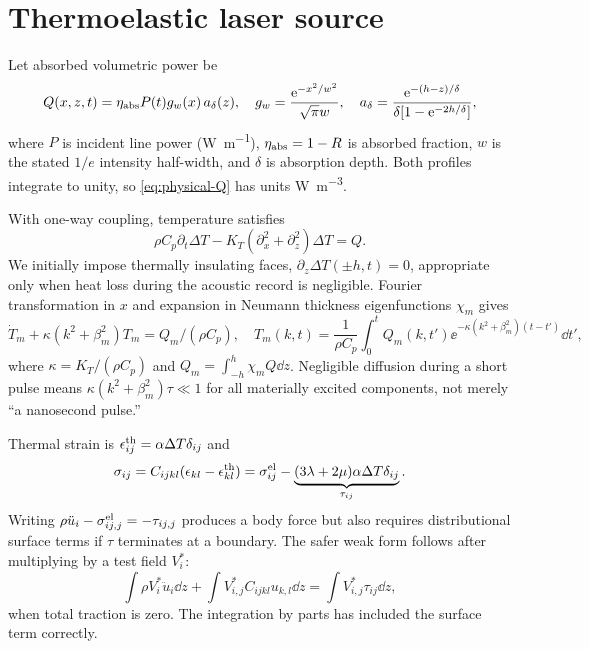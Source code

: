 \chapter{Thermoelastic laser source}\label{ch:source}
Let absorbed volumetric power be
\begin{equation}
 Q(x,z,t)=\eta_{\rm abs}P(t)g_w(x)\,a_\delta(z),\quad
 g_w=\frac{\mathrm{e}^{-x^2/w^2}}{\sqrt\pi w},\quad
 a_\delta=\frac{\mathrm{e}^{-(h-z)/\delta}}{\delta[1-\mathrm{e}^{-2h/\delta}]},
 \label{eq:physical-Q}
\end{equation}
where $P$ is incident line power (\si{W.m^{-1}}), $\eta_{\rm abs}=1-R$ is
absorbed fraction, $w$ is the stated $1/e$ intensity half-width, and $\delta$ is
absorption depth. Both profiles integrate to unity, so \cref{eq:physical-Q} has
units \si{W.m^{-3}}. 

With one-way coupling, temperature satisfies
\begin{equation}
 \rho C_p\partial_t\Delta T-K_T(\partial_x^2+\partial_z^2)\Delta T=Q.
 \label{eq:heat}
\end{equation}
We initially impose thermally insulating faces,
$\partial_z\Delta T(\pm h,t)=0$, appropriate only when heat loss during the
acoustic record is negligible.  Fourier transformation in $x$ and
expansion in Neumann thickness eigenfunctions $\chi_m$ gives
\begin{equation}
 \dot T_m+\kappa(k^2+\beta_m^2)T_m=Q_m/(\rho C_p),\quad
 T_m(k,t)=\frac1{\rho C_p}\int_0^t\!Q_m(k,t')
 \ee^{-\kappa(k^2+\beta_m^2)(t-t')}\dd t',\label{eq:heat-solution}
\end{equation}
where $\kappa=K_T/(\rho C_p)$ and
$Q_m=\int_{-h}^h\chi_mQ\dd z$. Negligible diffusion during a short pulse means
$\kappa(k^2+\beta_m^2)\tau\ll1$ for all materially excited components, not merely
``a nanosecond pulse.''

Thermal strain is $\epsilon_{ij}^{\rm th}=\alpha\Delta T\delta_{ij}$ and
\begin{equation}
 \sigma_{ij}=C_{ijkl}(\epsilon_{kl}-\epsilon_{kl}^{\rm th})
 =\sigma_{ij}^{\rm el}-\underbrace{(3\lambda+2\mu)\alpha\Delta T\delta_{ij}}_{\tau_{ij}}.
 \label{eq:thermal-stress}
\end{equation}
Writing $\rho\ddot u_i-\sigma_{ij,j}^{\rm el}=-\tau_{ij,j}$ produces a body
force but also requires distributional surface terms if $\tau$ terminates at a
boundary. The safer weak form follows after multiplying by a test field $V_i^*$:
\begin{equation}
 \int\rho V_i^*\ddot u_i\dd z+\int V_{i,j}^*C_{ijkl}u_{k,l}\dd z
 =\int V_{i,j}^*\tau_{ij}\dd z,
 \label{eq:weak-thermal}
\end{equation}
when total traction is zero. The integration by parts has included the surface
term correctly.


